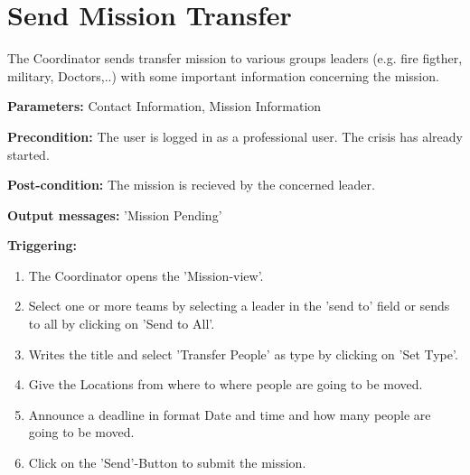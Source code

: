 \section{Send Mission Transfer}
\label{operation:Transfer}
The Coordinator sends transfer mission to various groups leaders (e.g. fire
figther, military, Doctors,..) with some important information concerning the
mission.\\
\begin{description}
\item \textbf{Parameters:} Contact Information, Mission Information
\item \textbf{Precondition:} The user is logged in as a professional user. The
crisis has already started. 
\item \textbf{Post-condition:} The mission is recieved by the concerned leader.
\item \textbf{Output messages:} 'Mission Pending'
\item \textbf{Triggering:}
\begin{enumerate}
\item The Coordinator opens the 'Mission-view'.
\item Select one or more teams by selecting a leader in the 'send to' field or
sends to all by clicking on 'Send to All'.
\item Writes the title and select 'Transfer People' as type by clicking on 'Set
Type'.
\item Give the Locations from where to where people are going to be moved.
\item Announce a deadline in format Date and time and how many people are going
to be moved.
\item Click on the 'Send'-Button to submit the mission.
\end{enumerate}
\end{description}


